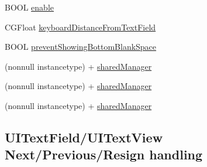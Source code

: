  \begin{DoxyCompactItemize}
\item 
B\+O\+OL \mbox{\hyperlink{interface_i_q_keyboard_manager_a201a0822bb074959b25ae79cd6538f85}{enable}}
\item 
C\+G\+Float \mbox{\hyperlink{interface_i_q_keyboard_manager_ab4fcf653985413bb2192ca2cc91ab707}{keyboard\+Distance\+From\+Text\+Field}}
\item 
B\+O\+OL \mbox{\hyperlink{interface_i_q_keyboard_manager_a0214eeeb68f29beb9570c31f12f7a0f0}{prevent\+Showing\+Bottom\+Blank\+Space}}
\item 
(nonnull instancetype) + \mbox{\hyperlink{interface_i_q_keyboard_manager_a159842a915f7df414b3e98ee829da9ca}{shared\+Manager}}
\item 
(nonnull instancetype) + \mbox{\hyperlink{interface_i_q_keyboard_manager_a34a9bbb02225b2508e06e6793138d99c}{shared\+Manager}}
\item 
(nonnull instancetype) + \mbox{\hyperlink{interface_i_q_keyboard_manager_a34a9bbb02225b2508e06e6793138d99c}{shared\+Manager}}
\end{DoxyCompactItemize}
\subsection*{U\+I\+Text\+Field/\+U\+I\+Text\+View Next/\+Previous/\+Resign handling}
\label{_amgrp0b02ae3191184f1e786c65307d570f46}%


 

